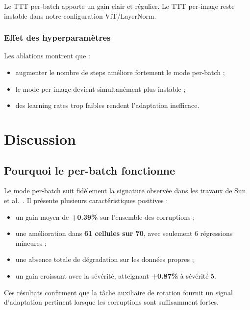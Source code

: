 \documentclass[12pt,a4paper]{report}
\begin{document}
	Le TTT per-batch apporte un gain clair et régulier.  
	Le TTT per-image reste instable dans notre configuration ViT/LayerNorm.
	
	\subsection{Effet des hyperparamètres}
	Les ablations montrent que :
	\begin{itemize}
		\item augmenter le nombre de steps améliore fortement le mode per-batch ;
		\item le mode per-image devient simultanément plus instable ;
		\item des learning rates trop faibles rendent l'adaptation inefficace.
	\end{itemize}
	\chapter{Discussion}
	
	\section{Pourquoi le per-batch fonctionne}
	Le mode per-batch suit fidèlement la signature observée dans les travaux de Sun et al.~\cite{Sun2020}.  
	Il présente plusieurs caractéristiques positives :
	\begin{itemize}
		\item un gain moyen de \textbf{+0.39\%} sur l’ensemble des corruptions ;
		\item une amélioration dans \textbf{61 cellules sur 70}, avec seulement 6 régressions mineures ;
		\item une absence totale de dégradation sur les données propres ;
		\item un gain croissant avec la sévérité, atteignant \textbf{+0.87\%} à sévérité 5.
	\end{itemize}
	Ces résultats confirment que la tâche auxiliaire de rotation fournit un signal d’adaptation pertinent lorsque les corruptions sont suffisamment fortes.
	
\end{document}
